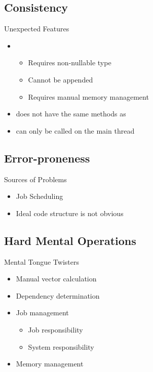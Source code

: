 \subsection{Consistency}
\begin{frame}{\secname}{\subsecname}
	Unexpected Features
	\begin{itemize}
		\item<2-> 
		\begin{itemize}
			\item<3-> Requires non-nullable type
			\item<4-> Cannot be appended
			\item<5-> Requires manual memory management
		\end{itemize}
		\item<6->  does not have the same methods as 
		\item<7->  can only be called on the main thread
	\end{itemize}
\end{frame}

\subsection{Error-proneness}
\begin{frame}{\secname}{\subsecname}
	Sources of Problems
	\begin{itemize}
		\item<2-> Job Scheduling
		\item<3-> Ideal code structure is not obvious
	\end{itemize}
\end{frame}

\subsection{Hard Mental Operations}
\begin{frame}{\secname}{\subsecname}
	Mental Tongue Twisters
	\begin{itemize}
		\item<2-> Manual vector calculation
		\item<3-> Dependency determination
		\item<4-> Job management
		\begin{itemize}
			\item<5-> Job responsibility
			\item<6-> System responsibility
		\end{itemize}
		\item<7-> Memory management
	\end{itemize}
\end{frame}

